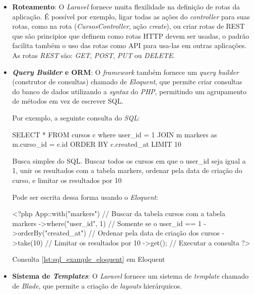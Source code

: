 \begin{itemize}
  \item \textbf{Roteamento}: O \textit{Laravel} fornece muita flexilidade na definição de rotas da aplicação. É possível por exemplo, ligar todas as ações do \textit{controller} para suas rotas, como na rota  (\textit{CursosController}, ação \textit{create}), ou criar rotas de \ac{REST} que são principios que definem como rotas HTTP devem ser usadas, o padrão facilita também o uso das rotas como API para usa-las em outras aplicações. As rotas \textit{REST} são: \textit{GET}, \textit{POST}, \textit{PUT} ou \textit{DELETE}.

  \item \textbf{\textit{Query Builder} e \ac{ORM}}: O \textit{framework} também fornece um \textit{query builder} (construtor de consultas) chamado de \textit{Eloquent}, que permite criar consultas do banco de dados utilizando a \textit{syntax} do \textit{PHP}, permitindo um agrupamento de métodos em vez de escrever \ac{SQL}.

  Por exemplo, a seguinte consulta do \textit{SQL}:
  \begin{listing}
    \begin{sqlcode}
      SELECT * FROM cursos c where user_id = 1
      JOIN m markers as m.curso_id = c.id
      ORDER BY c.created_at
      LIMIT 10
    \end{sqlcode}
    \caption{Busca simples do SQL. Buscar todos os cursos em que o user\_id seja igual a 1, unir os resultados com a tabela markers, ordenar pela data de criação do curso, e limitar os resultados por 10}
    \label{lst:sql_example_eloquent}
  \end{listing}

  Pode ser escrita dessa forma usando o \textit{Eloquent}:
  \begin{listing}
    \begin{phpcode}
      <?php
      App\Curso::with("markers") // Buscar da tabela cursos com a tabela markers
      ->where("user_id", 1) // Somente se o user_id == 1
      ->orderBy("created_at") // Ordenar pela data de criação dos cursos
      ->take(10) // Limitar os resultados por 10
      ->get(); // Executar a consulta
      ?>
    \end{phpcode}
    \caption{Consulta \ref{lst:sql_example_eloquent} em Eloquent}
    \label{lst:php_example_eloquent}
  \end{listing}

  \item \textbf{Sistema de \textit{Templates}}: O \textit{Laravel} fornece um sistema de \textit{template} chamado de \textit{Blade}, que permite a criação de \textit{layouts} hierárquicos.
\end{itemize}


